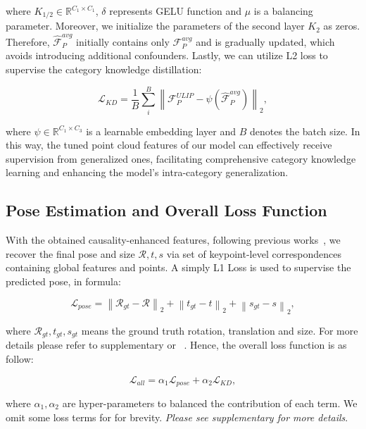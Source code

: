 where $K_{1/2} \in \mathbb{R}^{C_1 \times C_1}$, $\delta$ represents GELU function and $\mu$ is a balancing parameter. Moreover, we initialize the parameters of the second layer $K_{2}$ as zeros. Therefore, $\mathcal{\widehat{F}}_{P}^{avg}$ initially contains only $\mathcal{F}_{P}^{avg}$ and is gradually updated, which avoids introducing additional confounders.
Lastly, we can utilize L2 loss to supervise the category knowledge distillation:
\begin{small} 
\begin{equation}
\label{equ:distillation}
    \mathcal{L}_{KD} = \frac{1}{B} \sum_{i}^{B}\left\|\mathcal{F}^{ULIP}_{P}-\psi(\mathcal{\widehat{F}}_{P}^{avg})\right\|_{2},
\end{equation}
\end{small}
where $\psi \in \mathbb{R}^{C_1 \times C_3}$ is a learnable embedding layer and $B$ denotes the batch size. 
In this way, the tuned point cloud features of our model can effectively receive supervision from generalized ones, facilitating comprehensive category knowledge learning and enhancing the model's intra-category generalization.



\subsection{Pose Estimation and Overall Loss Function}
\label{sec:estimation_and_loss}
With the obtained causality-enhanced features, following previous works~\cite{lin2022category,lin2024instance}, we recover the final pose and size $\mathcal{R}, t, s$ via set of keypoint-level correspondences containing global features and points. A simply L1 Loss is used to supervise the predicted pose, in formula:
\begin{small} 
\begin{equation}
\label{equ:pose_rts}
    \mathcal{L}_{pose} = \left\|\mathcal{R}_{gt} - \mathcal{R}\right\|_{2} + \left\|t_{gt} - t\right\|_{2} + \left\|s_{gt} - s\right\|_{2},
\end{equation}
\end{small}
where $\mathcal{R}_{gt}, t_{gt}, s_{gt}$ means the ground truth rotation, translation and size. For more details please refer to supplementary or ~\cite{lin2024instance}. 
Hence, the overall loss function is as follow:
\begin{small} 
\begin{equation}
\label{equ:overall_loss_func}
    \mathcal{L}_{all} = \alpha_{1}\mathcal{L}_{pose} + \alpha_{2}\mathcal{L}_{KD},
\end{equation}
\end{small}
where $\alpha_{1}, \alpha_{2}$ are hyper-parameters to balanced the contribution of each term. We omit some loss terms for for brevity. \emph{Please see supplementary for more details}.

